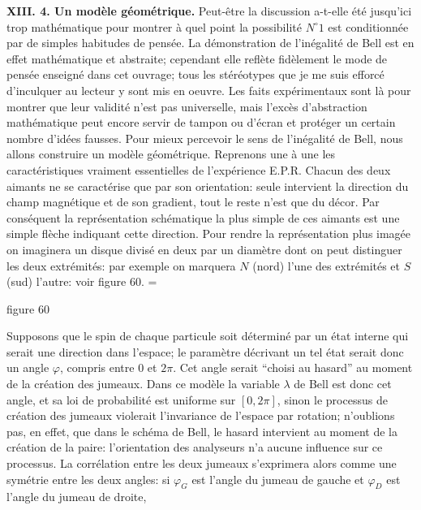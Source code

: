 {\bf XIII. 4. Un mod\`ele g\'eom\'etrique.}
\medskip
Peut-\^etre la discussion a-t-elle \'et\'e jusqu'ici trop
math\'e\-ma\-ti\-que pour montrer \`a quel point la possibilit\'e
$N^\circ 1$ est conditionn\'ee par de simples habitudes de pens\'ee. 
La d\'emonstration  de l'in\'egalit\'e  de Bell est en effet
math\'e\-ma\-tique et abstraite;  cependant elle refl\`ete fid\`element
le mode de pens\'ee enseign\'e dans cet ouvrage;  tous les st\'er\'eotypes
que je me suis efforc\'e d'inculquer au lecteur y sont mis en oeuvre. 
Les faits exp\'erimentaux  sont l\`a pour montrer que leur validit\'e
n'est pas universelle, mais l'exc\`es d'abstraction math\'ematique
peut encore servir de tampon ou d'\'ecran et prot\'eger un certain
nombre d'id\'ees fausses. Pour mieux percevoir  le sens de l'in\'egalit\'e
de Bell, nous  allons construire un mod\`ele g\'eom\'etrique. 
\medskip 
Reprenons une \`a une les caract\'eristiques vraiment essentielles  
de l'exp\'e\-rience E.P.R.  Chacun des deux aimants ne se caract\'erise que  
par son orientation:  seule intervient la direction du champ magn\'etique 
et de  son gradient, tout le reste n'est que du d\'ecor. Par cons\'equent  
la repr\'esentation sch\'ematique la plus simple de ces aimants est une 
simple fl\`eche indiquant cette direction. Pour rendre la repr\'esentation 
plus imag\'ee on  imaginera un disque divis\'e en deux par un diam\`etre 
dont on peut distinguer les deux extr\'emit\'es: par exemple on marquera 
$N$ (nord)  l'une des extr\'emit\'es et $S$ (sud) l'autre:  voir figure 60. 
\medskip 
\midinsert 
\epsfxsize=\hsize
{} 
\vskip3mm
\centerline{\eightpoint figure 60} 
\endinsert 
Supposons que le spin de chaque particule soit d\'etermin\'e  
par un \'etat interne qui serait une direction dans l'espace;  
le param\`etre d\'ecrivant un tel \'etat serait donc un angle $\varphi$, 
compris entre $0$ et $2\pi$. Cet angle serait ``choisi au hasard'' au 
moment de la cr\'eation des jumeaux. Dans ce mod\`ele la variable 
$\lambda$ de  Bell est donc cet angle, et sa loi de probabilit\'e est 
uniforme sur $[0, 2\pi]$, sinon le processus de cr\'eation des jumeaux 
violerait l'invariance de l'espace par rotation; n'oublions pas, en effet, 
que dans le sch\'ema de Bell, le hasard intervient au moment de la 
cr\'eation de la paire: l'orientation des analyseurs n'a aucune influence 
sur ce processus.  La corr\'elation entre les deux jumeaux s'exprimera 
alors comme une sym\'etrie entre les deux angles:  si  $\varphi_G$ est 
l'angle du jumeau de gauche et $\varphi_D$ est l'angle du jumeau de droite, 
